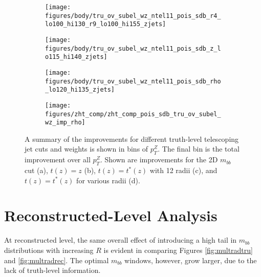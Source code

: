 \begin{figure}[!htbp]\captionsetup{justification=centering}
\begin{center}
\begin{subfigure}[t]{0.24\textwidth}\centering\texttt{[image: figures/body/tru\_ov\_subel\_wz\_ntel11\_pois\_sdb\_r4\_lo100\_hi130\_r9\_lo100\_hi155\_zjets]}\caption{}\end{subfigure}
\begin{subfigure}[t]{0.24\textwidth}\centering\texttt{[image: figures/body/tru\_ov\_subel\_wz\_ntel11\_pois\_sdb\_z\_lo115\_hi140\_zjets]}\caption{}\end{subfigure}
\begin{subfigure}[t]{0.24\textwidth}\centering\texttt{[image: figures/body/tru\_ov\_subel\_wz\_ntel11\_pois\_sdb\_rho\_lo120\_hi135\_zjets]}\caption{}\end{subfigure}
\begin{subfigure}[t]{0.24\textwidth}\centering\texttt{[image: figures/zht\_comp/zht\_comp\_pois\_sdb\_tru\_ov\_subel\_wz\_imp\_rho]}\caption{}\end{subfigure}
\caption{\label{fig:sigsumtru}A summary of the improvements for different truth-level telescoping jet cuts and weights is shown in bins of $p_T^Z$.  %
  The final bin is the total improvement over all $p_T^Z$.  Shown are improvements for the 2D $m_{bb}$ cut (a), $t\left(z\right)=z$ (b), $t\left(z\right)=t^*\left(z\right)$ with 12 radii (c), and $t\left(z\right)=t^*\left(z\right)$ for various radii (d).}
\end{center}
\end{figure}

\clearpage

\section{Reconstructed-Level Analysis}
\label{sec:rec}
At reconstructed level, the same overall effect of introducing a high tail in $m_{bb}$ distributions with increasing $R$ is evident in comparing Figures \ref{fig:multradtru} and \ref{fig:multradrec}.  The optimal $m_{bb}$ windows, however, grow larger, due to the lack of truth-level information.

